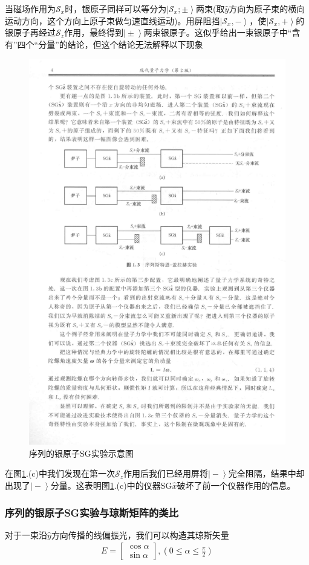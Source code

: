 \documentclass[UTF8,12pt]{article}
\providecommand\Ket[1]{\left|\right. #1 \left.\right\rangle}
\newenvironment{ale}{\begin{equation}\nonumber\begin{aligned}}{\end{aligned}\end{equation}}
\numberwithin{equation}{subsection}
\begin{document}
	当磁场作用为$\mathcal S_x$时，银原子同样可以等分为$\Ket{\mathcal S_x;\pm}$两束(取$\hat y$方向为原子束的横向运动方向，这个方向上原子束做匀速直线运动)。用屏阻挡$\Ket{\mathcal S_x,-}$，使$\Ket{\mathcal S_x,+}$的银原子再经过$\mathcal S_z$作用，最终得到$\Ket{\pm}$两束银原子。这似乎给出一束银原子中“含有”四个“分量”的结论，但这个结论无法解释以下现象
	\begin{figure}[H]
		\centering
		\includegraphics[width=0.6\linewidth]{sSGe.pdf}
		\caption{序列的银原子SG实验示意图}
		\label{sSGe}
	\end{figure}
	
	在图\ref{sSGe}.(c)中我们发现在第一次$\mathcal S_z$作用后我们已经用屏将$\Ket{-}$完全阻隔，结果中却出现了$\Ket{-}$分量。这表明图\ref{sSGe}.(c)中的仪器SG$\hat x$破坏了前一个仪器作用的信息。
	
	\subsubsection{序列的银原子SG实验与琼斯矩阵的类比}
	
	对于一束沿$\hat y$方向传播的线偏振光，我们可以构造其琼斯矢量
	\begin{ale}
		 E=\begin{bmatrix}
			\cos \alpha\\
			\sin \alpha
		\end{bmatrix},(0\leq\alpha\leq\frac{\pi}{2})
	\end{ale}
\end{document}
